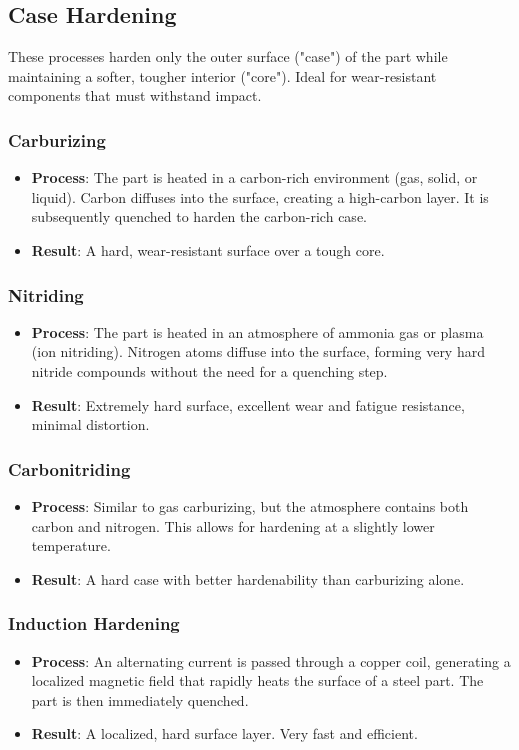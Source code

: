 \subsection{Case Hardening}
These processes harden only the outer surface ("case") of the part while maintaining a softer, tougher interior ("core"). Ideal for wear-resistant components that must withstand impact.
\subsubsection{Carburizing}
\begin{itemize}
  \item \textbf{Process}: The part is heated in a carbon-rich environment (gas, solid, or liquid). Carbon diffuses into the surface, creating a high-carbon layer. It is subsequently quenched to harden the carbon-rich case.
  \item \textbf{Result}: A hard, wear-resistant surface over a tough core.
\end{itemize}


\subsubsection{Nitriding}
\begin{itemize}
  \item \textbf{Process}: The part is heated in an atmosphere of ammonia gas or plasma (ion nitriding). Nitrogen atoms diffuse into the surface, forming very hard nitride compounds without the need for a quenching step.
  \item \textbf{Result}: Extremely hard surface, excellent wear and fatigue resistance, minimal distortion.
\end{itemize}


\subsubsection{Carbonitriding}
\begin{itemize}
  \item \textbf{Process}: Similar to gas carburizing, but the atmosphere contains both carbon and nitrogen. This allows for hardening at a slightly lower temperature.
  \item \textbf{Result}: A hard case with better hardenability than carburizing alone.
\end{itemize}


\subsubsection{Induction Hardening}
\begin{itemize}
  \item \textbf{Process}: An alternating current is passed through a copper coil, generating a localized magnetic field that rapidly heats the surface of a steel part. The part is then immediately quenched.
  \item \textbf{Result}: A localized, hard surface layer. Very fast and efficient.
\end{itemize}


